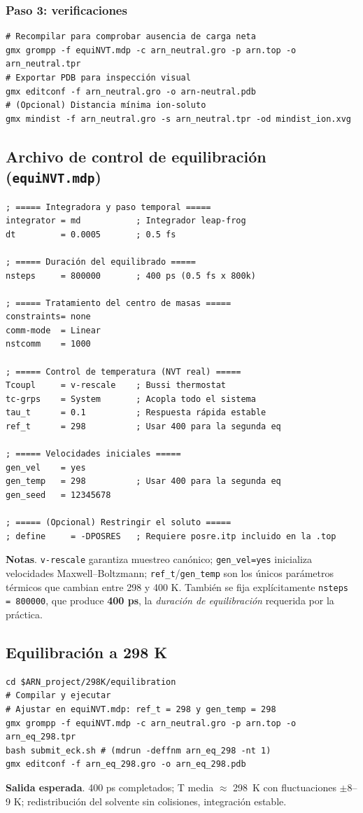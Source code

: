 \documentclass[12pt,a4paper]{article}
\begin{document}
\subsubsection*{Paso 3: verificaciones}
\begin{lstlisting}[style=bashstyle]
# Recompilar para comprobar ausencia de carga neta
gmx grompp -f equiNVT.mdp -c arn_neutral.gro -p arn.top -o arn_neutral.tpr
# Exportar PDB para inspección visual
gmx editconf -f arn_neutral.gro -o arn-neutral.pdb
# (Opcional) Distancia mínima ion-soluto
gmx mindist -f arn_neutral.gro -s arn_neutral.tpr -od mindist_ion.xvg
\end{lstlisting}

\subsection{Archivo de control de equilibración (\texttt{equiNVT.mdp})}
\begin{Verbatim}[fontsize=\small,frame=single]
; ===== Integradora y paso temporal =====
integrator = md           ; Integrador leap-frog
dt         = 0.0005       ; 0.5 fs

; ===== Duración del equilibrado =====
nsteps     = 800000       ; 400 ps (0.5 fs x 800k)

; ===== Tratamiento del centro de masas =====
constraints= none
comm-mode  = Linear
nstcomm    = 1000

; ===== Control de temperatura (NVT real) =====
Tcoupl     = v-rescale    ; Bussi thermostat 
tc-grps    = System       ; Acopla todo el sistema
tau_t      = 0.1          ; Respuesta rápida estable
ref_t      = 298          ; Usar 400 para la segunda eq

; ===== Velocidades iniciales =====
gen_vel    = yes
gen_temp   = 298          ; Usar 400 para la segunda eq
gen_seed   = 12345678

; ===== (Opcional) Restringir el soluto =====
; define     = -DPOSRES   ; Requiere posre.itp incluido en la .top
\end{Verbatim}
\textbf{Notas}. \texttt{v-rescale} garantiza muestreo canónico; \texttt{gen\_vel=yes} inicializa velocidades Maxwell–Boltzmann; \texttt{ref\_t}/\texttt{gen\_temp} son los únicos parámetros térmicos que cambian entre 298 y 400 K. También se fija explícitamente \texttt{nsteps = 800000}, que produce \textbf{400 ps}, la \emph{duración de equilibración} requerida por la práctica.

\subsection{Equilibración a 298 K}
\begin{lstlisting}[style=bashstyle]
cd $ARN_project/298K/equilibration
# Compilar y ejecutar
# Ajustar en equiNVT.mdp: ref_t = 298 y gen_temp = 298
gmx grompp -f equiNVT.mdp -c arn_neutral.gro -p arn.top -o arn_eq_298.tpr
bash submit_eck.sh # (mdrun -deffnm arn_eq_298 -nt 1)
gmx editconf -f arn_eq_298.gro -o arn_eq_298.pdb
\end{lstlisting}
\textbf{Salida esperada}. 400 ps completados; T media \(\approx\) \SI{298}{K} con fluctuaciones \(\pm\)8–9 K; redistribución del solvente sin colisiones, integración estable.
\end{document}
